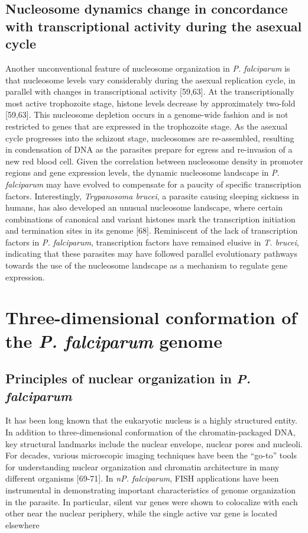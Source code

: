 \subsection{Nucleosome dynamics change in concordance with transcriptional
activity during the asexual cycle}

Another unconventional feature of nucleosome organization in \textit{P.
falciparum} is that nucleosome levels vary considerably during the asexual
replication cycle, in parallel with changes in transcriptional activity
\citep{bunnik:DNA-encoded, ponts:nucleosome} [59,63].
At the transcriptionally most active trophozoite stage, histone
levels decrease by approximately two-fold \citep{bunnik:DNA-encoded, ponts:nucleosome}
[59,63]. This nucleosome depletion
occurs in a genome-wide fashion and is not restricted to genes that are
expressed in the trophozoite stage. As the asexual cycle progresses into the
schizont stage, nucleosomes are re-assembled, resulting in condensation of DNA
as the parasites prepare for egress and re-invasion of a new red blood cell.
Given the correlation between nucleosome density in promoter regions and gene
expression levels, the dynamic nucleosome landscape in \textit{P. falciparum} may have
evolved to compensate for a paucity of specific transcription factors.
Interestingly, \textit{Trypanosoma brucei}, a parasite causing sleeping sickness in
humans, has also developed an unusual nucleosome landscape, where certain
combinations of canonical and variant histones mark the transcription
initiation and termination sites in its genome \citep{seigel:four}
[68]. Reminiscent of the lack
of transcription factors in \textit{P. falciparum}, transcription factors have remained
elusive in \textit{T. brucei}, indicating that these parasites may have followed
parallel evolutionary pathways towards the use of the nucleosome landscape as
a mechanism to regulate gene expression.


\section{Three-dimensional conformation of the \textit{P. falciparum} genome}

\subsection{Principles of nuclear organization in \textit{P. falciparum}}

It has been long known that the eukaryotic nucleus is a highly structured
entity. In addition to three-dimensional conformation of the
chromatin-packaged DNA, key structural landmarks include the nuclear envelope,
nuclear pores and nucleoli. For decades, various microscopic imaging
techniques have been the “go-to” tools for understanding nuclear organization
and chromatin architecture in many different organisms
\citep{cremer:chromosome}
[69-71]. In \textit{nP.
falciparum}, FISH applications have been instrumental in demonstrating
important characteristics of genome organization in the parasite. In
particular, silent var genes were shown to colocalize with each other near the
nuclear periphery, while the single active var gene is located elsewhere

